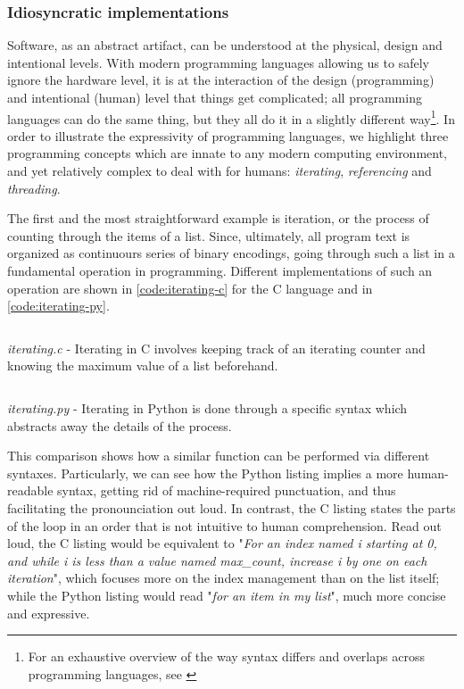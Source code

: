 \subsubsection{Idiosyncratic implementations}
\label{subsubsec:idiosyncracies-implementations}

Software, as an abstract artifact, can be understood at the physical, design and intentional levels\citep{moor_three_1978}. With modern programming languages allowing us to safely ignore the hardware level, it is at the interaction of the design (programming) and intentional (human) level that things get complicated; all programming languages can do the same thing, but they all do it in a slightly different way\footnote{For an exhaustive overview of the way syntax differs and overlaps across programming languages, see \citep{rigaux_syntax_2023}}. In order to illustrate the expressivity of programming languages, we highlight three programming concepts which are innate to any modern computing environment, and yet relatively complex to deal with for humans: \emph{iterating}, \emph{referencing} and \emph{threading}.

The first and the most straightforward example is iteration, or the process of counting through the items of a list. Since, ultimately, all program text is organized as continuours series of binary encodings, going through such a list in a fundamental operation in programming. Different implementations of such an operation are shown in \autoref{code:iterating-c} for the C language and in \autoref{code:iterating-py}.

\begin{listing}
  \inputminted{c}{./corpus/iterating.c}
  \caption{\emph{iterating.c} - Iterating in C involves keeping track of an iterating counter and knowing the maximum value of a list beforehand.}
  \label{code:iterating-c}
\end{listing}

\begin{listing}
  \inputminted{py}{./corpus/iterating.py}
  \caption{\emph{iterating.py} - Iterating in Python is done through a specific syntax which abstracts away the details of the process.}
  \label{code:iterating-py}
\end{listing}

This comparison shows how a similar function can be performed via different syntaxes. Particularly, we can see how the Python listing implies a more human-readable syntax, getting rid of machine-required punctuation, and thus facilitating the pronounciation out loud. In contrast, the C listing states the parts of the loop in an order that is not intuitive to human comprehension. Read out loud, the C listing would be equivalent to "\emph{For an index named i starting at 0, and while i is less than a value named max\_count, increase i by one on each iteration}", which focuses more on the index management than on the list itself; while the Python listing would read "\emph{for an item in my list}", much more concise and expressive.

